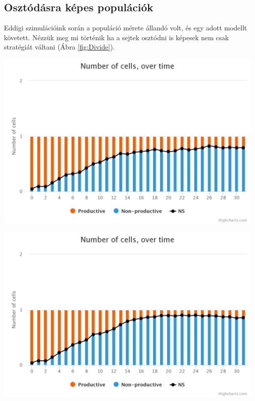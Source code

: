 \subsection{Osztódásra képes populációk}

Eddigi szimulációink során a populáció mérete állandó volt, és egy adott modellt követett. Nézzük meg mi történik ha a sejtek osztódni is képesek nem csak stratégiát váltani (Ábra \ref{fig:Divide}). 

\begin{minipage}{\linewidth}
	\centering
	\begin{multicols}{2}
		\begin{Figure}
			\centering
			\includegraphics[width=\linewidth]{images/nemosztodik}
		\end{Figure}
		\begin{Figure}
			\centering
			\includegraphics[width=\linewidth]{images/osztodik}
		\end{Figure}
	\end{multicols}
\end{minipage}\\

